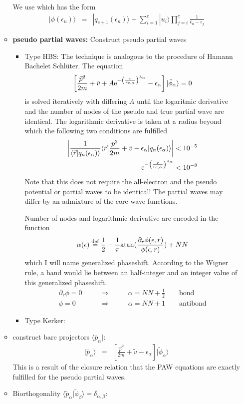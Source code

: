 \documentclass[11pt,a4paper]{report}
\begin{document}
\begin{enumerate}
\begin{itemize}
  We use  which has the form
  \begin{eqnarray*}
    |\phi(\epsilon_n)\rangle&=& |q_{c+1}(\epsilon_n)\rangle+\sum_{i=1}^{c}
    |u_i\rangle\prod_{j=i}^{c}\frac{1}{\bar{\epsilon}_n-\epsilon_j}
    \label{eq:fromqntophi}
  \end{eqnarray*}
%
\item \textbf{pseudo partial waves:} Construct pseudo partial waves
\begin{itemize}
\item Type HBS: The technique is analogous to the procedure of Hamann
  Bachelet Schl\"uter.
The equation 
\begin{eqnarray*}
\left[\frac{\vec{p}^2}{2m}+\tilde{v}
+ A\mathrm{e}^{-\left(\frac{r}{r_{c,\alpha}}\right)^{\lambda_\alpha}}-\epsilon_\alpha\right]
|\tilde\phi_\alpha\rangle=0
\end{eqnarray*}
is solved iteratively with differing $A$ until the logaritmic
derivative and the number of nodes of the pseudo and true partial wave
are identical. The logarithmic derivative is taken at a radius beyond
which the following two conditions are fulfilled
\begin{eqnarray*}
\left|\frac{1}{\langle\vec{r}|q_n(\epsilon_\alpha)\rangle}
\langle\vec{r}|
\frac{p^2}{2m}+\tilde{v}-\epsilon_\alpha|q_n(\epsilon_\alpha)\rangle\right|
<10^{-5}
\\
\mathrm{e}^{-\left(\frac{r}{r_{c,\alpha}}\right)^{\lambda_\alpha}}<10^{-8}
\end{eqnarray*}
Note that this does not require the all-electron and the pseudo
potential or partial waves to be identical! The partial waves may
differ by an admixture of the core wave functions.

Number of nodes and logarithmic derivative are encoded in the function
\begin{eqnarray*}
\alpha(\epsilon)\stackrel{\text{def}}{=}
\frac{1}{2}-\frac{1}{\pi}
{\rm atan}(\frac{\partial_r\phi(\epsilon,r)}{\phi(\epsilon,r)})+NN
\end{eqnarray*}
which I will name generalized phaseshift.  According to the Wigner
rule, a band would lie between an half-integer and an integer value of
this generalized phaseshift. 
\begin{eqnarray*}
\partial_r\phi=0&\qquad\Rightarrow\qquad&\alpha= NN+\frac{1}{2}\qquad\text{bond}
\\
\phi=0&\qquad\Rightarrow\qquad&\alpha=NN+1\qquad\text{antibond}
\end{eqnarray*}


\item Type Kerker:
\end{itemize}
\item construct bare projectors $\langle\bar{p}_\alpha|$:
\begin{eqnarray*}
|\bar{p}_\alpha\rangle
&=&\left[\frac{\vec{p}^2}{2m}+\tilde{v}-\epsilon_\alpha\right]
|\tilde{\phi}_\alpha\rangle
\end{eqnarray*}
This is a result of the closure relation that the PAW equations are
exactly fulfilled for the pseudo partial waves.
\item Biorthogonality
  $\langle\tilde{p}_\alpha|\tilde{\phi}_\beta\rangle=\delta_{\alpha,\beta}$:


\end{itemize}
\end{enumerate}
\end{document}
